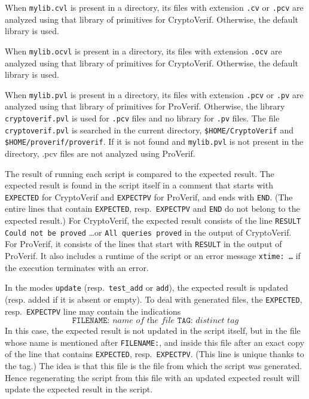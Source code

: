 \documentclass{article}
\begin{document}
When \texttt{mylib.cvl} is present in a directory, its files with extension \texttt{.cv} or \texttt{.pcv} are analyzed
using that library of primitives for CryptoVerif. Otherwise, the default library is used.

When \texttt{mylib.ocvl} is present in a directory, its files with extension \texttt{.ocv} are analyzed
using that library of primitives for CryptoVerif. Otherwise, the default library is used.

When \texttt{mylib.pvl} is present in a directory, its files with extension \texttt{.pcv} or \texttt{.pv} are analyzed
using that library of primitives for ProVerif. Otherwise, the library \texttt{cryptoverif.pvl} is used for \texttt{.pcv} files and no library for \texttt{.pv} files. The file \texttt{cryptoverif.pvl} is searched in the current directory, \texttt{\$HOME/CryptoVerif} and \texttt{\$HOME/proverif/proverif}. If it is not found and \texttt{mylib.pvl} is not present in the directory, {.pcv} files are not analyzed using ProVerif.

The result of running each script is compared to the expected result. The expected result is found in the script itself
in a comment that starts with \texttt{EXPECTED} for CryptoVerif and \texttt{EXPECTPV} for ProVerif, and ends with \texttt{END}. (The entire lines that contain \texttt{EXPECTED}, resp.~\texttt{EXPECTPV} and \texttt{END} do not belong to the expected result.)
For CryptoVerif, the expected result consists of the line \texttt{RESULT Could not be proved} \ldots or \texttt{All queries proved} in the output of CryptoVerif. For ProVerif, it consists of the lines that start with \texttt{RESULT} in the output of ProVerif. It also includes a runtime of the script or an error message \texttt{xtime: \dots} if the execution terminates with an error.

In the modes \texttt{update} (resp.~\texttt{test\_add} or \texttt{add}), the expected result is updated (resp. added if it is absent or empty). To deal with generated files, the \texttt{EXPECTED}, resp.~\texttt{EXPECTPV} line may contain the indications
\[\texttt{FILENAME: }\textit{name of the file}\texttt{ TAG: }\textit{distinct tag}\]
In this case, the expected result is not updated in the script itself, but in the file whose
name is mentioned after \texttt{FILENAME:}, and inside this file after an exact copy of the line that contains \texttt{EXPECTED}, resp.~\texttt{EXPECTPV}. (This line is unique thanks to the tag.) The idea is that this file is the file from which the script was generated. Hence regenerating the script from this file with an updated expected result will update the expected result in the script.
\end{document}
